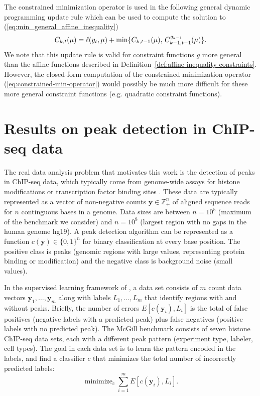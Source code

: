 \documentclass{article}
\DeclareMathOperator*{\minimize}{minimize}
\newcommand{\ZZ}{\mathbb Z}
\begin{document}
The constrained minimization operator is used in the following general
dynamic programming update rule which can be used to compute the
solution to (\ref{eq:min_general_affine_inequality})
\begin{equation}
  \label{eq:general_dp}
  C_{k,t}(\mu) = \ell(y_t,\mu) + \min\{
  C_{k,t-1}(\mu),\,
  C_{k-1,t-1}^{g_{k-1}}(\mu)
  \}.
\end{equation}
We note that this update rule is valid for constraint functions $g$
more general than the affine functions described in
Definition~\ref{def:affine-inequality-constraints}. However, the
closed-form computation of the constrained minimization operator
(\ref{eq:constrained-min-operator}) would possibly be much more
difficult for these more general constraint functions (e.g. quadratic
constraint functions).

\section{Results on peak detection in ChIP-seq data}
\label{sec:results-chip-seq}
\label{sec:results}

The real data analysis problem that motivates this work is the
detection of peaks in ChIP-seq data, which typically come from
genome-wide assays for histone modifications or transcription factor
binding sites \citep{practical}. These data are typically represented
as a vector of non-negative counts $\mathbf y\in\ZZ_+^n$ of aligned
sequence reads for $n$ continguous bases in a genome. Data sizes are
between $n=10^5$ (maximum of the benchmark we consider) and $n=10^8$
(largest region with no gaps in the human genome hg19). A peak
detection algorithm can be represented as a function
$c(\mathbf y)\in\{0,1\}^n$ for binary classification at every base
position. The positive class is peaks (genomic regions with large
values, representing protein binding or modification) and the negative
class is background noise (small values).


In the supervised learning framework of \citet{HOCKING2016-chipseq}, a
data set consists of $m$ count data vectors
$\mathbf y_1,\dots,\mathbf y_m$ along with labels $L_1,\dots, L_m$
that identify regions with and without peaks. Briefly, the number of
errors $E[c(\mathbf y_i), L_i]$ is the total of false positives
(negative labels with a predicted peak) plus false negatives (positive
labels with no predicted peak). The McGill benchmark consists of seven
histone ChIP-seq data sets, each with a different peak pattern
(experiment type, labeler, cell types). The goal in each data set is
to learn the pattern encoded in the labels, and find a classifier $c$
that minimizes the total number of incorrectly predicted labels:
\begin{equation}
  \label{eq:learn}
  \minimize_c
  \sum_{i=1}^m E\left[
    c(\mathbf y_i), L_i
  \right].
\end{equation}
\end{document}
